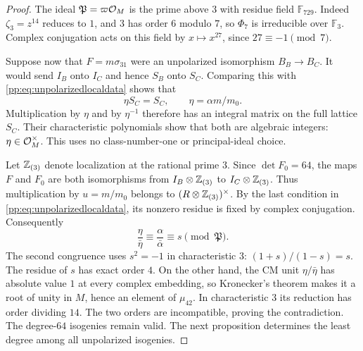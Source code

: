 \begin{proof}
The ideal $\mathfrak P=\varpi\mathcal O_M$ is the prime above $3$ with residue
field $\mathbb F_{729}$. Indeed $\zeta_3=z^{14}$ reduces to $1$, and
$3$ has order $6$ modulo $7$, so $\Phi_7$ is irreducible over
$\mathbb F_3$. Complex conjugation acts on this field by $x\mapsto
x^{27}$, since $27\equiv-1\pmod7$.

Suppose now that $F=m\sigma_{31}$ were an unpolarized isomorphism
$B_B\to B_C$. It would send $I_B$ onto $I_C$ and hence $S_B$ onto
$S_C$. Comparing this with \eqref{pp:eq:unpolarizedlocaldata} shows that
\[
 \eta S_C=S_C,\qquad \eta=\alpha m/m_0.
\]
Multiplication by $\eta$ and by $\eta^{-1}$ therefore has an integral
matrix on the full lattice $S_C$. Their characteristic polynomials
show that both are algebraic integers: $\eta\in\mathcal O_M^\times$.
This uses no class-number-one or principal-ideal choice.

Let $\mathbb Z_{(3)}$ denote localization at the rational prime $3$.
Since $\det F_0=64$, the maps $F$ and $F_0$ are both isomorphisms
from $I_B\otimes\mathbb Z_{(3)}$ to $I_C\otimes\mathbb Z_{(3)}$.
Thus multiplication by $u=m/m_0$ belongs to
$(R\otimes\mathbb Z_{(3)})^\times$. By the last condition in
\eqref{pp:eq:unpolarizedlocaldata}, its nonzero residue is fixed by
complex conjugation. Consequently
\[
 \frac{\eta}{\bar\eta}\equiv
 \frac{\alpha}{\bar\alpha}\equiv s\pmod{\mathfrak P}.
\]
The second congruence uses $s^2=-1$ in characteristic $3$:
$(1+s)/(1-s)=s$. The residue of $s$ has exact order $4$.
On the other hand, the CM unit $\eta/\bar\eta$ has absolute value $1$
at every complex embedding, so Kronecker's theorem makes it a root
of unity in $M$, hence an element of $\mu_{42}$. In characteristic
$3$ its reduction has order dividing $14$. The two orders are
incompatible, proving the contradiction.
The degree-$64$ isogenies remain valid. The next proposition determines
the least degree among all unpolarized isogenies.
\end{proof}

